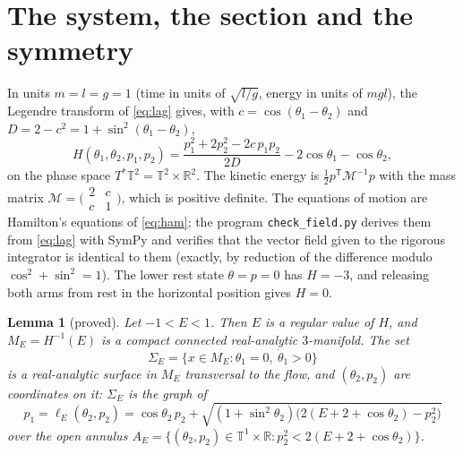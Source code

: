 \documentclass[11pt]{article}
\newtheorem{lemma}{Lemma}
\theoremstyle{definition}
\newcommand{\R}{\mathbb{R}}
\begin{document}
\section{The system, the section and the symmetry}\label{sec:setting}

In units $m = l = g = 1$ (time in units of $\sqrt{l/g}$, energy in units of $mgl$), the Legendre transform of \eqref{eq:lag} gives, with $c = \cos(\theta_1 - \theta_2)$ and $D = 2 - c^2 = 1 + \sin^2(\theta_1 - \theta_2)$,
\begin{equation}\label{eq:ham}
  H(\theta_1, \theta_2, p_1, p_2) = \frac{p_1^2 + 2p_2^2 - 2c\,p_1p_2}{2D} - 2\cos\theta_1 - \cos\theta_2 ,
\end{equation}
on the phase space $T^*\mathbb{T}^2 = \mathbb{T}^2 \times \R^2$. The kinetic energy is $\frac12 p^{\mathsf T}\mathcal M^{-1}p$ with the mass matrix $\mathcal M = \bigl(\begin{smallmatrix} 2 & c\\ c & 1\end{smallmatrix}\bigr)$, which is positive definite. The equations of motion are Hamilton's equations of \eqref{eq:ham}; the program \texttt{check\_field.py} derives them from \eqref{eq:lag} with SymPy and verifies that the vector field given to the rigorous integrator is identical to them (exactly, by reduction of the difference modulo $\cos^2 + \sin^2 = 1$). The lower rest state $\theta = p = 0$ has $H = -3$, and releasing both arms from rest in the horizontal position gives $H = 0$.

\begin{lemma}[proved]\label{lem:levels}
Let $-1 < E < 1$. Then $E$ is a regular value of $H$, and $M_E = H^{-1}(E)$ is a compact connected real-analytic $3$-manifold. The set
\[
  \Sigma_E = \{x \in M_E : \theta_1 = 0,\ \dot\theta_1 > 0\}
\]
is a real-analytic surface in $M_E$ transversal to the flow, and $(\theta_2, p_2)$ are coordinates on it: $\Sigma_E$ is the graph of
\begin{equation}\label{eq:lift}
  p_1 = \ell_E(\theta_2, p_2) = \cos\theta_2\, p_2 + \sqrt{(1 + \sin^2\theta_2)\bigl(2(E + 2 + \cos\theta_2) - p_2^2\bigr)}
\end{equation}
over the open annulus $A_E = \{(\theta_2, p_2) \in \mathbb{T}^1 \times \R : p_2^2 < 2(E + 2 + \cos\theta_2)\}$.
\end{lemma}
\end{document}
